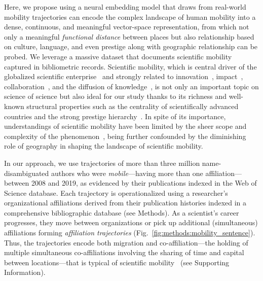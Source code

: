 \documentclass[12pt]{article} %
\def\SI{Supporting Information}
\begin{document}
Here, we propose using a neural embedding model that draws from real-world mobility trajectories can encode the complex landscape of human mobility into a dense, continuous, and meaningful vector-space representation, from which not only a meaningful \textit{functional distance} between places but also relationship based on culture, language, and even prestige along with geographic relationship can be probed. 
We leverage a massive dataset that documents scientific mobility captured in bibliometric records. Scientific mobility, which is central driver of the globalized scientific enterprise~\autocite{czaika2018globalisation, altbach2004globalization, box2008competition} and strongly related to innovation~\autocite{braunerhjelm2020labor, kaiser2018innovation, armano2017innovation}, impact~\autocite{sugimoto2017mostimpact, petersen2018multiscale, franzoni2014advantage}, collaboration~\autocite{rodrigues2016mobility}, and the diffusion of knowledge~\autocite{braunerhjelm2020labor, azoulay2011diffusion, morgan2018prestige}, is not only an important topic on science of science but also ideal for our study thanks to its richness and well-known structural properties such as the centrality of scientifically advanced countries and the strong prestige hierarchy~\autocite{auriol2010careers, clauset2015hierarchy, deville2014career}. 
In spite of its importance, understandings of scientific mobility have been limited by the sheer scope and complexity of the phenomenon~\autocite{robinson2019mobility, vannoorden2012mobility, deville2014career, ackers2008mobility, scott2015dynamics}, being further confounded by the diminishing role of geography in shaping the landscape of scientific mobility.

In our approach, we use trajectories of more than three million name-disambiguated authors who were \textit{mobile}---having more than one affiliation---between 2008 and 2019, as evidenced by their publications indexed in the Web of Science database.
Each trajectory is operationalized using a researcher's organizational affiliations derived from their publication histories indexed in a comprehensive bibliographic database (see Methods).
As a scientist's career progresses, they move between organizations or pick up additional (simultaneous) affiliations forming \textit{affiliation trajectories} (Fig.~\ref{fig:methods:mobility_sentence}).
Thus, the trajectories encode both migration and co-affiliation---the holding of multiple simultaneous co-affiliations involving the sharing of time and capital between locations---that is typical of scientific mobility~\autocite{rodrigues2016mobility, markova2016synchronous, sugimoto2017mostimpact} (see \SI).
\end{document}
